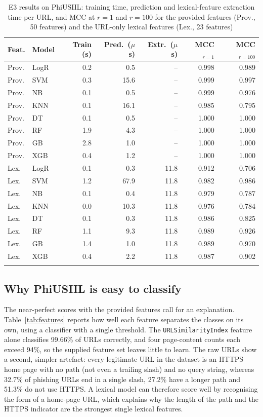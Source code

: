 \documentclass[pdflatex,sn-mathphys-num]{sn-jnl}%
\theoremstyle{thmstyleone}%
\theoremstyle{thmstyletwo}%
\theoremstyle{thmstylethree}%
\begin{document}
\begin{table}[htbp]
\caption{E3 results on PhiUSIIL: training time, prediction and lexical-feature extraction time per URL, and MCC at $r=1$ and $r=100$ for the provided features (Prov., 50 features) and the URL-only lexical features (Lex., 23 features)}\label{tab:e3}%
\begin{tabular}{@{}llrrrrr@{}}
\toprule
Feat. & Model & Train (s) & Pred.\ ($\mu$s) & Extr.\ ($\mu$s) & MCC$_{r=1}$ & MCC$_{r=100}$ \\
\midrule
Prov. & LogR & 0.2 & 0.5 & -- & 0.998 & 0.989 \\
Prov. & SVM & 0.3 & 15.6 & -- & 0.999 & 0.997 \\
Prov. & NB & 0.1 & 0.5 & -- & 0.999 & 0.976 \\
Prov. & KNN & 0.1 & 16.1 & -- & 0.985 & 0.795 \\
Prov. & DT & 0.1 & 0.5 & -- & 1.000 & 1.000 \\
Prov. & RF & 1.9 & 4.3 & -- & 1.000 & 1.000 \\
Prov. & GB & 2.8 & 1.0 & -- & 1.000 & 1.000 \\
Prov. & XGB & 0.4 & 1.2 & -- & 1.000 & 1.000 \\
Lex. & LogR & 0.1 & 0.3 & 11.8 & 0.912 & 0.706 \\
Lex. & SVM & 1.2 & 67.9 & 11.8 & 0.982 & 0.986 \\
Lex. & NB & 0.1 & 0.4 & 11.8 & 0.979 & 0.787 \\
Lex. & KNN & 0.0 & 10.3 & 11.8 & 0.976 & 0.784 \\
Lex. & DT & 0.1 & 0.3 & 11.8 & 0.986 & 0.825 \\
Lex. & RF & 1.1 & 9.3 & 11.8 & 0.989 & 0.926 \\
Lex. & GB & 1.4 & 1.0 & 11.8 & 0.989 & 0.970 \\
Lex. & XGB & 0.4 & 2.2 & 11.8 & 0.987 & 0.902 \\
\botrule
\end{tabular}
\end{table}

\subsection{Why PhiUSIIL is easy to classify}\label{subsec5-feat}

The near-perfect scores with the provided features call for an explanation. Table~\ref{tab:features} reports how well each feature separates the classes on its own, using a classifier with a single threshold. The \texttt{URLSimilarityIndex} feature alone classifies 99.66\% of URLs correctly, and four page-content counts each exceed 94\%, so the supplied feature set leaves little to learn. The raw URLs show a second, simpler artefact: every legitimate URL in the dataset is an HTTPS home page with no path (not even a trailing slash) and no query string, whereas 32.7\% of phishing URLs end in a single slash, 27.2\% have a longer path and 51.3\% do not use HTTPS. A lexical model can therefore score well by recognising the form of a home-page URL, which explains why the length of the path and the HTTPS indicator are the strongest single lexical features.
\end{document}
